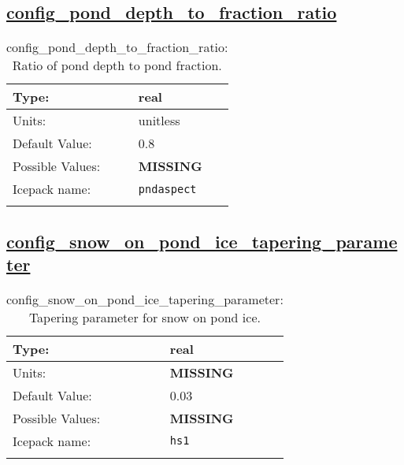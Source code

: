 \subsection[config\_pond\_depth\_to\_fraction\_ratio]{\hyperref[sec:nm_tab_meltponds]{config\_pond\_depth\_to\_fraction\_ratio}}
\label{subsec:nm_sec_config_pond_depth_to_fraction_ratio}
\begin{center}
\begin{longtable}{| p{2.0in} || p{4.0in} |}
    \hline
    Type: & real \\
    \hline
    Units: & \si{unitless} \\
    \hline
    Default Value: & 0.8 \\
    \hline
    Possible Values: & {\bf \color{red} MISSING} \\
    \hline
    Icepack name: & \verb+pndaspect+ \\
    \hline
    \caption{config\_pond\_depth\_to\_fraction\_ratio: Ratio of pond depth to pond fraction.}
\end{longtable}
\end{center}
\subsection[config\_snow\_on\_pond\_ice\_tapering\_parameter]{\hyperref[sec:nm_tab_meltponds]{config\_snow\_on\_pond\_ice\_tapering\_parameter}}
\label{subsec:nm_sec_config_snow_on_pond_ice_tapering_parameter}
\begin{center}
\begin{longtable}{| p{2.0in} || p{4.0in} |}
    \hline
    Type: & real \\
    \hline
    Units: & {\bf \color{red} MISSING} \\
    \hline
    Default Value: & 0.03 \\
    \hline
    Possible Values: & {\bf \color{red} MISSING} \\
    \hline
    Icepack name: & \verb+hs1+ \\
    \hline
    \caption{config\_snow\_on\_pond\_ice\_tapering\_parameter: Tapering parameter for snow on pond ice.}
\end{longtable}
\end{center}
